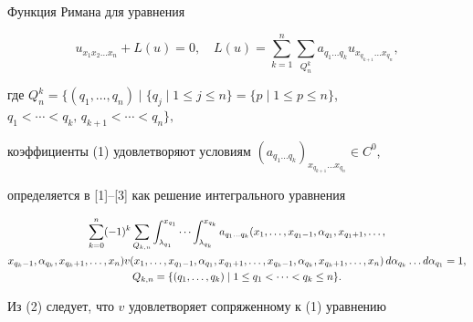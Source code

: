 \label{begin}








Функция Римана для уравнения


\begin{equation}


u_{x_{1} x_{2} \dotsc x_{n}}+L(u)=0,\quad


L(u)=\sum_{k=1}^{n} \sum_{Q_{n}^{k}} a_{q_{1}\dotsc q_{k}}u_{x_{q_{k+1}}\dotsc


x_{q_{n}}},


\end{equation}


где $Q_{n}^{k}=\{(q_{1},\dotsc ,q_{n})\mid \{q_{j}\mid 1\leq j \leq n\}=


\{p\mid 1\leq p\leq n\}$, $q_{1}<\dotsb <q_{k},\, q_{k+1}<\dotsb <


q_{n}\},$


коэффициенты (1) удовлетворяют условиям $(a_{q_{1}\dotsc


q_{k}})_{x_{q_{k+1}}\dotsc x_{q_{n}}}\in C^{0}$,


определяется в [1]--[3] как решение интегрального уравнения


\begin{gather}


\sum_{k=0}^{n} (-1)^{k}\sum_{Q_{k,n}} \int_{\lambda_{q_{1}}}^{x_{q_{1}}}


\dotsb \int_{\lambda_{q_{k}}}^{x_{q_{k}}} a_{q_{1}\dotsc q_{k}}


(x_{1},\dotsc ,x_{q_{1}-1}, \alpha_{q_{1}}, x_{q_{1}+1},\dotsc, \notag\\


x_{q_{k}-1},\alpha_{q_{k}},x_{q_{k}+1},\dotsc ,x_{n})


v(x_{1},\dotsc ,x_{q_{1}-1}, \alpha_{q_{1}},x_{q_{1}+1},\dotsc ,


x_{q_{k}-1},\alpha_{q_{k}},


x_{q_{k}+1},\dotsc ,x_{n})\, d\alpha_{q_{k}}\dotsc d\alpha_{q_{1}}=1,\\


Q_{k,n}=\{(q_{1},\dotsc,q_{k})\mid 1\leq q_{1}<\dotsb<q_{k}\le n\}.\notag


\end{gather}


Из (2) следует, что $v$ удовлетворяет сопряженному к (1) уравнению


